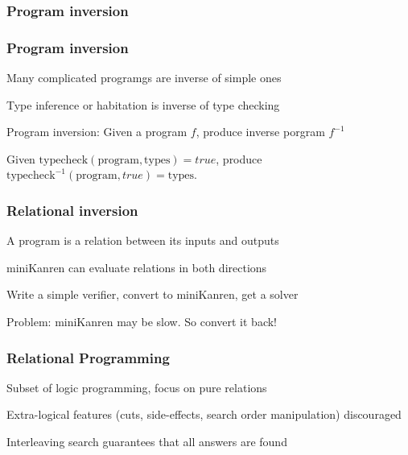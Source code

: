 \documentclass[xcolor=table, aspectratio=169]{beamer}
\begin{document}
\begin{frame}[fragile]
    \frametitle{Program inversion}
\end{frame}
\begin{frame}[fragile]
    \frametitle{Program inversion}
    \begin{center}
        Many complicated programgs are inverse of simple ones
    \end{center}
    \vfill
    \begin{center}
        Type inference or habitation is inverse of type checking
    \end{center}
    \vfill
    \begin{center}
        Program inversion: Given a program $f$, produce inverse porgram  $f^{-1}$
    \end{center}
    \vfill
    \begin{center}
        Given $\text{typecheck}(\text{program}, \text{types}) = true$, produce $\text{typecheck}^{-1}(\text{program}, true) = \text{types}$.
    \end{center}
\end{frame}
\begin{frame}[fragile]
    \frametitle{Relational inversion}
    \begin{center}
        A program is a relation between its inputs and outputs
    \end{center}
    \vfill
    \begin{center}
        miniKanren can evaluate relations in both directions
    \end{center}
    \vfill
    \begin{center}
        Write a simple verifier, convert to miniKanren, get a solver
    \end{center}
    \vfill
    \begin{center}
        Problem: miniKanren may be slow. So convert it back!
    \end{center}
\end{frame}

\begin{frame}[fragile]
  \frametitle{Relational Programming}

    \begin{center}
        Subset of logic programming, focus on pure relations
    \end{center}
    \vfill
    \begin{center}
        Extra-logical features (cuts, side-effects, search order manipulation) discouraged
    \end{center}
    \vfill
    \begin{center}
        Interleaving search guarantees that all answers are found
    \end{center}
\end{frame}
\end{document}
